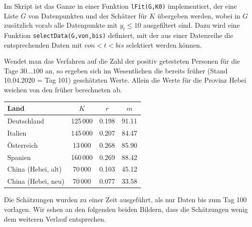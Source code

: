 \documentclass[a4paper,11pt]{article}
\begin{document}
Im Skript ist das Ganze in einer Funktion \texttt{lFit(G,K0)} implementiert,
der eine Liste $G$ von Datenpunkten und der Schätzer für $K$ übergeben werden,
wobei in $G$ zusätzlich vorab alle Datenpunkte mit $y_t\le 10$ ausgefiltert
sind.  Dazu wird eine Funktion \texttt{selectData(G,von,bis)} definiert, mit
der aus einer Datenreihe die entsprechenden Daten mit $von<t<bis$ selektiert
werden können.

Wendet man das Verfahren auf die Zahl der positiv getesteten Personen
für die Tage $30\dots 100$ an, so ergeben sich im Wesentlichen die bereits
früher (Stand 10.04.2020 = Tag 101) geschätzten Werte. Allein die Werte für
die Provinz Hebei weichen von den früher berechneten ab.
\begin{center}
  \begin{tabular}{|l|c|c|c|}\hline
    Land & $K$ & $r$ & $m$ \\\hline
    Deutschland & 125\,000 & 0.198 & 91.11\\
    Italien & 145\,000 & 0.207 & 84.47\\
    Österreich & 13\,000 & 0.268 & 85.90 \\
    Spanien & 160\,000 & 0.269 & 88.42 \\
    China (Hebei, alt) & 70\,000 & 0.103 & 45.12\\
    China (Hebei, neu) & 70\,000 & 0.077 & 33.58\\\hline
  \end{tabular}
\end{center}
Die Schätzungen wurden zu einer Zeit ausgeführt, als nur Daten bis zum Tag 100
vorlagen.  Wir sehen an den folgenden beiden Bildern, dass die Schätzungen
wenig dem weiteren Verlauf entsprechen.  
\end{document}
